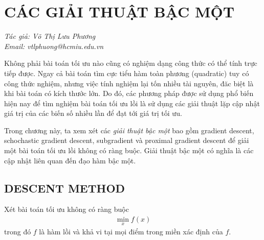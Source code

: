 \documentclass{book}
\begin{document}
%
%

\setcounter{chapter}{3}
\chapter{CÁC GIẢI THUẬT BẬC MỘT}
\textit{Tác giả: Võ Thị Lưu Phương\\Email: vtlphuong@hcmiu.edu.vn}

Không phải bài toán tối ưu nào cũng có nghiệm dạng công thức có thể tính trực tiếp được. 
Ngay cả bài toán tìm cực tiểu hàm toàn phương (quadratic) tuy có công thức nghiệm, nhưng việc tính nghiệm lại tốn nhiều tài nguyên, đăc biệt là khi bài toán có kích thước lớn. 
Do đó, các phương pháp được sử dụng phổ biến hiện nay để tìm nghiệm bài toán tối ưu lồi là sử dụng các giải thuật lặp cập nhật giá trị của các biến số nhiều lần để đạt tới giá trị tối ưu.

Trong chương này, ta xem xét các \emph{giải thuật bậc một} bao gồm gradient descent, schochastic gradient descent, subgradient và proximal gradient descent để giải một bài toán tối ưu lồi không có ràng buộc. 
Giải thuật bậc một có nghĩa là các cập nhật liên quan đến đạo hàm bậc một.

\section{DESCENT METHOD}

Xét bài toán tối ưu không có ràng buộc
\begin{align*}
\min_x f(x)
\end{align*}
trong đó $f$ là hàm lồi và khả vi tại mọi điểm trong miền xác định của $f$.

%
\end{document}
